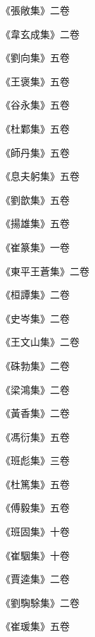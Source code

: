 \begin{pinyinscope}
 《張敞集》二卷



 《韋玄成集》二卷



 《劉向集》五卷



 《王褒集》五卷



 《谷永集》五卷



 《杜鄴集》五卷



 《師丹集》五卷



 《息夫躬集》五卷



 《劉歆集》五卷



 《揚雄集》五卷



 《崔篆集》一卷



 《東平王蒼集》二卷



 《桓譚集》二卷



 《史岑集》二卷



 《王文山集》二卷



 《硃勃集》二卷



 《梁鴻集》二卷



 《黃香集》二卷



 《馮衍集》五卷



 《班彪集》三卷



 《杜篤集》五卷



 《傅毅集》五卷



 《班固集》十卷



 《崔駰集》十卷



 《賈逵集》二卷



 《劉騊駼集》二卷



 《崔瑗集》五卷




\end{pinyinscope}
